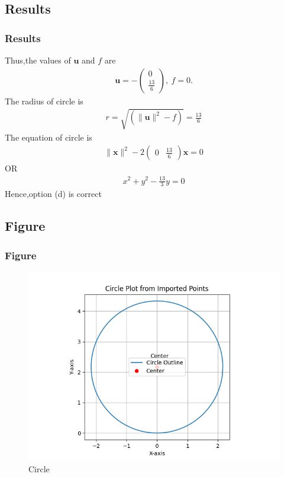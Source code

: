 \documentclass{beamer}
\theoremstyle{remark}
\providecommand{\norm}[1]{\lVert#1\rVert}
\newcommand{\myvec}[1]{\ensuremath{\begin{pmatrix}#1\end{pmatrix}}}
\let\vec\mathbf
\numberwithin{equation}{section}
\begin{document}
\subsection{Results}
\begin{frame}[fragile]
\frametitle{Results}

Thus,the values of $\vec{u}$ and $f$ are
\begin{align}
	\vec{u} = -\myvec{0\\\frac{13}{6}},\
	f = 0.
\end{align}
The radius of circle is
\begin{align}
	r=\sqrt{(\norm{\vec{u}}^2-f)}=\frac{13}{6}
\end{align}
The equation of circle is
\begin{align}
	\norm{\vec{x}}^2-2\myvec{0 & \frac{13}{6}}\vec{x}=0
\end{align}
OR
\begin{align}
x^2+y^2-\frac{13}{3}y=0
\end{align}
Hence,option (d) is correct

\end{frame}
%
\subsection{Figure}
\begin{frame}
\frametitle{Figure}
\begin{figure}
\centering
\includegraphics[width=0.6\columnwidth]{figs/Figure_1.png}
\caption{Circle}
\label{fig:circle_diameter}
\end{figure}
\end{frame}

\end{document}
